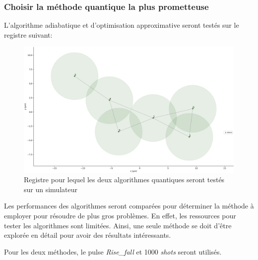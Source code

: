 \documentclass[11pt]{article}
\begin{document}
\subsubsection{Choisir la méthode quantique la plus prometteuse}
L'algorithme adiabatique et d'optimisation approximative seront testés sur le registre suivant: 

\begin{figure}[H]
    \centering
    \includegraphics[width = 0.48\linewidth]{images/registre_exemple.png}
    \caption{Registre pour lequel les deux algorithmes quantiques seront testés sur un simulateur}
\end{figure}\label{graphtocompare}

Les performances des algorithmes seront comparées pour déterminer la méthode à employer pour résoudre de plus gros problèmes. En effet, les ressources pour tester les algorithmes sont limitées. Ainsi, une seule méthode se doit d'être explorée en détail pour avoir des résultats intéressants.

Pour les deux méthodes, le pulse \textit{Rise\_fall} et 1000 \textit{shots} seront utilisés.
\end{document}

